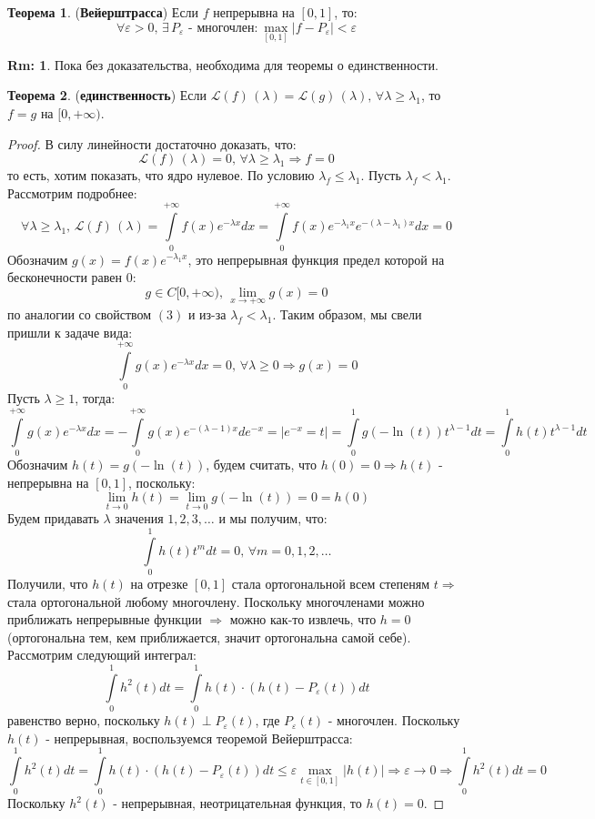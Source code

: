 \documentclass[12pt]{article}
\newcommand{\ML}{\mathcal{L}}
\newcommand{\VE}{\varepsilon}
\theoremstyle{definition}
\newtheorem{rem}{Rm:}
\newtheorem{theorem}{Теорема}
\newcommand{\ddint}[2]{\displaystyle\int\limits_{#1}^{#2}}
\begin{document}
\begin{theorem}(\textbf{Вейерштрасса})
	Если $f$ непрерывна на $[0,1]$, то: 
	$$
		\forall \VE > 0, \, \exists \, P_\VE \text{ - многочлен:} \,  \max\limits_{[0,1]}\left|f - P_\VE\right| < \VE
	$$
\end{theorem}
\begin{rem}
	Пока без доказательства, необходима для теоремы о единственности.
\end{rem}
\begin{theorem}(\textbf{единственность})
	Если $\ML(f) \, (\lambda) =\ML(g) \, (\lambda), \, \forall \lambda \geq \lambda_1$, то $f = g$ на $[0, +\infty)$.
\end{theorem}
\begin{proof}
	В силу линейности достаточно доказать, что:
	$$
		\ML(f)\, (\lambda) = 0, \, \forall \lambda \geq \lambda_1 \Rightarrow f = 0
	$$
	то есть, хотим показать, что ядро нулевое. По условию $ \lambda_f \leq \lambda_1$. Пусть $\lambda_f < \lambda_1$. Рассмотрим подробнее:
	$$
		\forall \lambda \geq \lambda_1, \, \ML(f)\, (\lambda) = \ddint{0}{+\infty}f(x)e^{-\lambda x}dx = \ddint{0}{+\infty}f(x)e^{-\lambda_1 x}e^{-(\lambda - \lambda_1)x}dx = 0
	$$
	Обозначим $g(x) = f(x)e^{-\lambda_1 x}$, это непрерывная функция предел которой на бесконечности равен $0$:
	$$
		g \in C[0, +\infty), \, \lim\limits_{x \to +\infty}g(x) = 0
	$$
	по аналогии со свойством $(3)$ и из-за $\lambda_f < \lambda_1$. Таким образом, мы свели пришли к задаче вида:
	$$
		\ddint{0}{+\infty}g(x)e^{-\lambda x}dx = 0, \, \forall \lambda \geq 0 \Rightarrow g(x) = 0
	$$
	Пусть $\lambda \geq 1$, тогда:
	$$
		\ddint{0}{+\infty}g(x)e^{-\lambda x}dx = - \ddint{0}{+\infty}g(x) e^{-(\lambda - 1)x}de^{-x} = \left|e^{-x} = t\right| = \ddint{0}{1}g(-\ln{(t)})t^{\lambda - 1}dt = \ddint{0}{1}h(t)t^{\lambda - 1}dt
	$$
	Обозначим $h(t) = g(-\ln{(t)})$, будем считать, что $h(0) = 0 \Rightarrow h(t)$ - непрерывна на $[0,1]$, поскольку:
	$$
		\lim\limits_{t \to 0}h(t) = \lim\limits_{t \to 0} g(-\ln{(t)}) = 0 = h(0)
	$$
	Будем придавать $\lambda$ значения $1, 2, 3, \dotsc$ и мы получим, что:
	$$
		\ddint{0}{1}h(t)t^m dt = 0, \, \forall m = 0,1,2, \dotsc
	$$
	Получили, что $h(t)$ на отрезке $[0,1]$ стала ортогональной всем степеням $t \Rightarrow$ стала ортогональной любому многочлену. Поскольку многочленами можно приближать непрерывные функции $\Rightarrow$ можно как-то извлечь, что $h = 0$ (ортогональна тем, кем приближается, значит ортогональна самой себе). Рассмотрим следующий интеграл:
	$$
		\ddint{0}{1}h^2(t)dt = \ddint{0}{1}h(t){\cdot}\left(h(t) - P_\VE(t)\right)dt
	$$
 	равенство верно, поскольку $h(t) \perp P_\VE(t)$, где $P_\VE(t)$ - многочлен. Поскольку $h(t)$ - непрерывная, воспользуемся теоремой Вейерштрасса:
 	$$
 		\ddint{0}{1}h^2(t)dt = \ddint{0}{1}h(t){\cdot}\left(h(t) - P_\VE(t)\right)dt \leq \VE\max\limits_{t \in [0,1]}|h(t)| \Rightarrow \VE \to 0 \Rightarrow \ddint{0}{1}h^2(t)dt = 0
 	$$
 	Поскольку $h^2(t)$ - непрерывная, неотрицательная функция, то $h(t) = 0$.
\end{proof}
\end{document}
